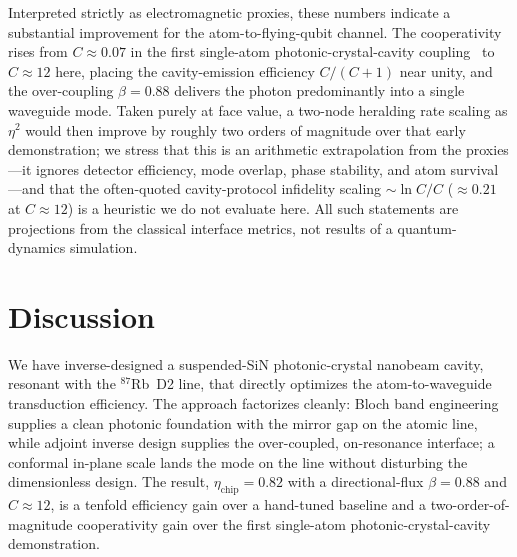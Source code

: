 \documentclass[%
 reprint,
 amsmath,amssymb,
 aps,prx,
 superscriptaddress,
]{revtex4-2}
\begin{document}
Interpreted strictly as electromagnetic proxies, these numbers indicate a
substantial improvement for the atom-to-flying-qubit channel. The cooperativity
rises from $C\approx0.07$ in the first single-atom photonic-crystal-cavity
coupling~\cite{thompson2013} to $C\approx12$ here, placing the cavity-emission
efficiency $C/(C{+}1)$ near unity, and the over-coupling $\beta=0.88$ delivers the
photon predominantly into a single waveguide mode. Taken purely at face
value, a two-node heralding rate scaling as $\eta^2$ would then improve by roughly
two orders of magnitude over that early demonstration; we stress that this is an
arithmetic extrapolation from the proxies---it ignores detector efficiency, mode
overlap, phase stability, and atom survival---and that the often-quoted
cavity-protocol infidelity scaling $\sim\ln C/C$ ($\approx0.21$ at $C\approx12$) is
a heuristic we do not evaluate here. All such statements are projections from the
classical interface metrics, not results of a quantum-dynamics simulation.

\section{Discussion}

We have inverse-designed a suspended-SiN photonic-crystal nanobeam cavity,
resonant with the $^{87}$Rb~D2 line, that directly optimizes the
atom-to-waveguide transduction efficiency. The approach factorizes cleanly: Bloch
band engineering supplies a clean photonic foundation with the mirror gap on the
atomic line, while adjoint inverse design supplies the over-coupled, on-resonance
interface; a conformal in-plane scale lands the mode on the line without
disturbing the dimensionless design. The result, $\eta_\mathrm{chip}=0.82$ with a
directional-flux $\beta=0.88$ and $C\approx12$, is a tenfold efficiency gain over a
hand-tuned baseline and a two-order-of-magnitude cooperativity gain over the first
single-atom photonic-crystal-cavity demonstration.
\end{document}
